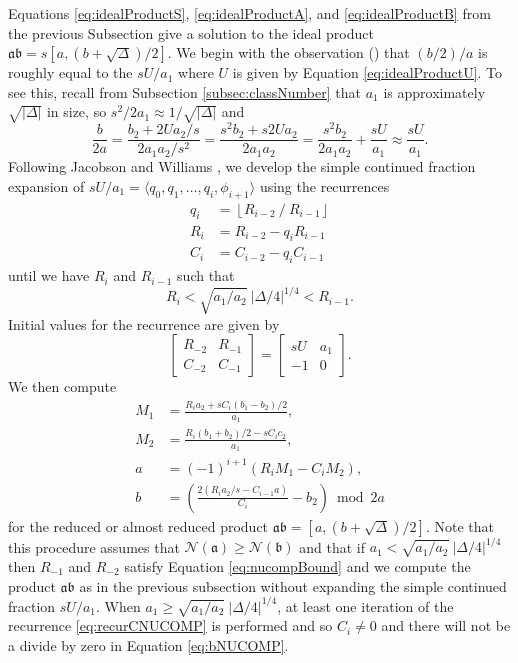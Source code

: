 \documentclass{ucalgthes1}
\theoremstyle{definition}
\newcommand{\matrixtt}[4]{\left[ \begin{array}{rr} #1 & #2 \\ #3 & #4 \end{array} \right]}
\newcommand{\floor}[1]{\left\lfloor #1 \right\rfloor}
\begin{document}
Equations \ref{eq:idealProductS}, \ref{eq:idealProductA}, and \ref{eq:idealProductB} from the previous Subsection give a solution to the ideal product $\mathfrak a \mathfrak b = s[a, (b+\sqrt\Delta)/2]$.  We begin with the observation (\cite[p.119]{Jacobson2009}) that $(b/2)/a$ is roughly equal to the $sU / a_1$ where $U$ is given by Equation \ref{eq:idealProductU}. To see this, recall from Subsection \ref{subsec:classNumber} that $a_1$ is approximately $\sqrt{|\Delta|}$ in size, so $s^2 / 2 a_1 \approx 1 / \sqrt{|\Delta|}$ and
\[
	\frac{b}{2a} = \frac{b_2 + 2Ua_2/s}{2a_1a_2/s^2} 
	= \frac{s^2 b_2+s2Ua_2}{2a_1a_2}
	= \frac{s^2b_2}{2a_1a_2} + \frac{sU}{a_1}
	\approx \frac{sU}{a_1}.
\]
Following Jacobson and Williams \cite[pp.120-121]{Jacobson2009}, we develop the simple continued fraction expansion of $sU/a_1 = \langle q_0, q_1, \dots, q_i, \phi_{i+1} \rangle$ using the recurrences
\begin{align}
	q_i &= \floor{R_{i-2} ~/~ R_{i-1}} \label{eq:recurqNUCOMP} \\
	R_i &= R_{i-2} - q_i R_{i-1} \label{eq:recurRNUCOMP} \\
	C_i &= C_{i-2} - q_i C_{i-1} \label{eq:recurCNUCOMP}
\end{align}
until we have $R_i$ and $R_{i-1}$ such that
\begin{equation}
\label{eq:nucompBound}
	R_i < \sqrt{a_1/a_2} ~ |\Delta/4|^{1/4} < R_{i-1}.
\end{equation}
Initial values for the recurrence are given by
\[
	\matrixtt{R_{-2}}{R_{-1}}{C_{-2}}{C_{-1}} = \matrixtt{sU}{a_1}{-1}{0}.
\]
We then compute
\begin{align}
	M_1 &= \frac{R_i a_2 + sC_i(b_1-b_2)/2}{a_1}, \nonumber \\
	M_2 &= \frac{R_i (b_1+b_2)/2 - s C_i c_2}{a_1}, \nonumber \\
	a &= (-1)^{i+1} (R_i M_1  - C_i M_2), \nonumber \\
	b &= \left( \frac{2(R_i a_2 /s - C_{i-1} a)}{C_i} - b_2 \right) \bmod 2a \label{eq:bNUCOMP}
\end{align}
for the reduced or almost reduced product $\mathfrak a \mathfrak b = [a, (b + \sqrt\Delta)/2]$.  Note that this procedure assumes that $\mathcal N(\mathfrak a) \ge \mathcal N(\mathfrak b)$ and that if $a_1 < \sqrt{a_1/a_2} ~ |\Delta/4|^{1/4}$ then $R_{-1}$ and $R_{-2}$ satisfy Equation \ref{eq:nucompBound} and we compute the product $\mathfrak a \mathfrak b$ as in the previous subsection without expanding the simple continued fraction $sU/a_1$.  When $a_1 \ge \sqrt{a_1/a_2} ~ |\Delta/4|^{1/4}$, at least one iteration of the recurrence \ref{eq:recurCNUCOMP} is performed and so $C_i \neq 0$ and there will not be a divide by zero in Equation \ref{eq:bNUCOMP}.
\end{document}
